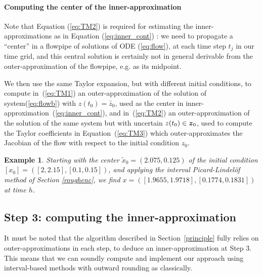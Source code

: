 \documentclass{sig-alternate-05-2015} %
\newcommand\ForAuthors[1]%
 {\par\smallskip                     %
  \begin{center}%
   \fbox%
   {\parbox{0.9\linewidth}%
    {\raggedright\sc--- #1}%
   }%
  \end{center}%
  \par\smallskip                     %
 }
\newtheorem{example}{Example}
\def\intvl#1{\mbox{$[ #1 ]$}}
\newtheorem{remark}{Remark}
\begin{document}
\paragraph{Computing the center of the inner-approximation}

Note that Equation (\ref{eq:TM2}) is required for estimating the inner-approximations as in Equation (\ref{eq:inner_cont}) : we need to propagate a ``center'' in 
a flowpipe of solutions of ODE (\ref{eq:flow}), at each time step $t_j$ in our time
grid, and this central solution is certainly not in general derivable from the 
outer-approximation of the flowpipe, e.g. as its midpoint. 
 
We then use the same Taylor expansion, but with different initial conditions, to compute in~(\ref{eq:TM1}) an outer-approximation of the solution of system(\ref{eq:flowb}) 
with $z(t_0)=\tilde{z_0}$, used as the center in inner-approximation~(\ref{eq:inner_cont}), and  in~(\ref{eq:TM2}) an outer-approximation of the solution of the 
same system but with uncertain $z(t_0) \in \z_0$, used to compute the Taylor coefficients in Equation~(\ref{eq:TM3}) which outer-approximates the Jacobian of the flow 
with respect to the initial condition $z_0$. 

\begin{example}
\label{runningcenter}
Starting with the center $\tilde{x}_0=(2.075,0.125)$ of the initial condition $\intvl{x_0}=\left(
\left[2,2.15\right],\left[0.1,0.15\right]\right)$, and applying the interval Picard-Lindel\"of method
of Section \ref{roughenc}, 
we find $x=\left(\left[1.9655, 1.9718\right], 
\left[0.1774, 0.1831\right]
\right)$ at time $h$.  
\end{example}


\subsection{Step 3: computing the inner-approximation}
\label{practicalissues}

It must be noted that the algorithm described in Section~\ref{principle} fully relies on outer-approximations in each step, 
to deduce an inner-approximation at Step 3. This means that we can soundly compute and implement our approach using interval-based 
methods with outward rounding as classically. 
\end{document}
